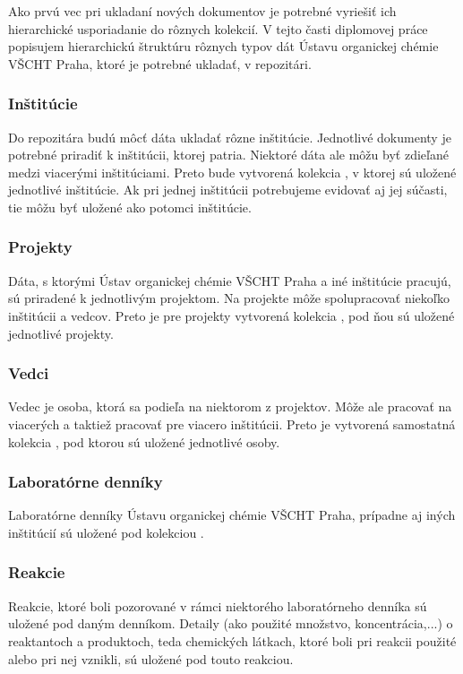 \documentclass[thesis=M,slovak]{FITthesis}[2013/05/06]
\begin{document}
Ako prvú vec pri ukladaní nových dokumentov je potrebné vyriešiť ich hierarchické usporiadanie do rôznych kolekcií. V tejto časti diplomovej práce popisujem hierarchickú štruktúru rôznych typov dát Ústavu organickej chémie VŠCHT Praha, ktoré je potrebné ukladať, v repozitári.

\subsubsection{Inštitúcie}
Do repozitára budú môcť dáta ukladať rôzne inštitúcie. Jednotlivé dokumenty je potrebné priradiť k inštitúcii, ktorej patria. Niektoré dáta ale môžu byť zdieľané medzi viacerými inštitúciami. Preto bude vytvorená kolekcia , v ktorej sú uložené jednotlivé inštitúcie. Ak pri jednej inštitúcii potrebujeme evidovať aj jej súčasti, tie môžu byť uložené ako potomci inštitúcie.

\subsubsection{Projekty}
Dáta, s ktorými Ústav organickej chémie VŠCHT Praha a iné inštitúcie pracujú, sú priradené k jednotlivým projektom. Na projekte môže spolupracovať niekoľko inštitúcii a vedcov. Preto je pre projekty vytvorená kolekcia , pod ňou sú uložené jednotlivé projekty.

\subsubsection{Vedci}
Vedec je osoba, ktorá sa podieľa na niektorom z projektov. Môže ale pracovať na viacerých a taktiež pracovať pre viacero inštitúcii. Preto je vytvorená samostatná kolekcia , pod ktorou sú uložené jednotlivé osoby.

\subsubsection{Laboratórne denníky}
Laboratórne denníky Ústavu organickej chémie VŠCHT Praha, prípadne aj iných inštitúcií sú uložené pod kolekciou .

\subsubsection{Reakcie}
Reakcie, ktoré boli pozorované v rámci niektorého laboratórneho denníka sú uložené pod daným denníkom. Detaily (ako použité množstvo, koncentrácia,...) o reaktantoch a produktoch, teda chemických látkach, ktoré boli pri reakcii použité alebo pri nej vznikli, sú uložené pod touto reakciou.
\end{document}
